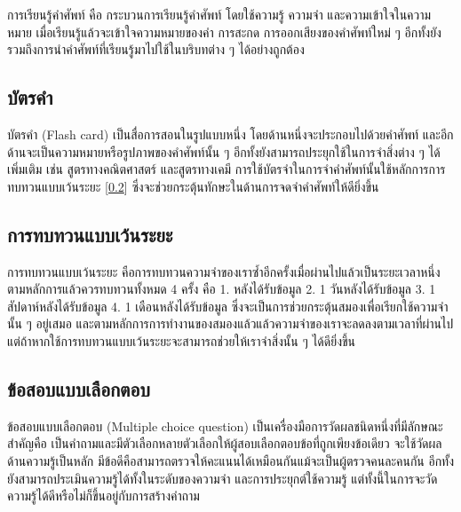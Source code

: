 \documentclass[12pt,oneside,openright,a4paper]{cpe-thai-project}
\begin{document}
\hspace{1cm}
การเรียนรู้คำศัพท์ \cite{LearnEng} คือ กระบวนการเรียนรู้คำศัพท์ โดยใช้ความรู้ ความจำ และความเข้าใจในความหมาย เมื่อเรียนรู้แล้วจะเข้าใจความหมายของคำ
การสะกด การออกเสียงของคำศัพท์ใหม่ ๆ อีกทั้งยังรวมถึงการนำคำศัพท์ที่เรียนรู้มาไปใช้ในบริบทต่าง ๆ ได้อย่างถูกต้อง

\subsection{บัตรคำ}

\hspace{1cm}
บัตรคำ (Flash card) \cite{Flashcard} เป็นสื่อการสอนในรูปแบบหนึ่ง โดยด้านหนึ่งจะประกอบไปด้วยคำศัพท์
และอีกด้านจะเป็นความหมายหรือรูปภาพของคำศัพท์นั้น ๆ อีกทั้งยังสามารถประยุกใช้ในการจำสิ่งต่าง ๆ ได้เพิ่มเติม เช่น
สูตรทางคณิตศาสตร์ และสูตรทางเคมี การใช้บัตรจำในการจำคำศัพท์นั้นใช้หลักการการทบทวนแบบเว้นระยะ [\ref{ssec:SpacedRepetition}]
ซึ่งจะช่วยกระตุ้นทักษะในด้านการจดจำคำศัพท์ให้ดียิ่งขึ้น

\subsection{การทบทวนแบบเว้นระยะ}\label{ssec:SpacedRepetition}

\hspace{1cm}
การทบทวนแบบเว้นระยะ \cite{SpacedRepetition} คือการทบทวนความจำของเราซ้ำอีกครั้งเมื่อผ่านไปแล้วเป็นระยะเวลาหนึ่ง ตามหลักการแล้วควรทบทวนทั้งหมด 4 ครั้ง คือ
1. หลังได้รับข้อมูล 2. 1 วันหลังได้รับข้อมูล 3. 1 สัปดาห์หลังได้รับข้อมูล 4. 1 เดือนหลังได้รับข้อมูล
ซึ่งจะเป็นการช่วยกระตุ้นสมองเพื่อเรียกใช้ความจำนั้น ๆ อยู่เสมอ และตามหลักการการทำงานของสมองแล้วแล้วความจำของเราจะลดลงตามเวลาที่ผ่านไป 
แต่ถ้าหากใช้การทบทวนแบบเว้นระยะจะสามารถช่วยให้เราจำสิ่งนั้น ๆ ได้ดียิ่งขึ้น

\subsection{ข้อสอบแบบเลือกตอบ}

\hspace{1cm}
ข้อสอบแบบเลือกตอบ (Multiple choice question) \cite{MultiChoices} เป็นเครื่องมือการวัดผลชนิดหนึ่งที่มีลักษณะสำคัญคือ
เป็นคำถามและมีตัวเลือกหลายตัวเลือกให้ผู้สอบเลือกตอบข้อที่ถูกเพียงข้อเดียว จะใช้วัดผลด้านความรู้เป็นหลัก
มีข้อดีคือสามารถตรวจให้คะแนนได้เหมือนกันแม้จะเป็นผู้ตรวจคนละคนกัน อีกทั้งยังสามารถประเมินความรู้ได้ทั้งในระดับของความจำ
และการประยุกต์ใช้ความรู้ แต่ทั้งนี้ในการจะวัดความรู้ได้ดีหรือไม่ก็ขึ้นอยู่กับการสร้างคำถาม
\end{document}
